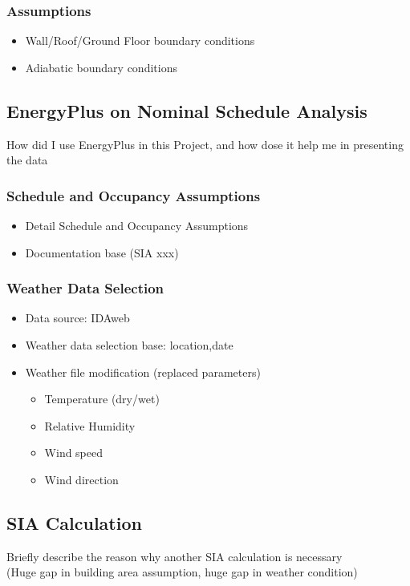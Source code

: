 \documentclass[11pt, a4paper]{article}
\theoremstyle{definition}
\begin{document}
		\subsubsection{Assumptions}
			\begin{itemize}
				\item Wall/Roof/Ground Floor boundary conditions
				\item Adiabatic boundary conditions
			\end{itemize}
			
	\subsection{EnergyPlus on Nominal Schedule Analysis}
		How did I use EnergyPlus in this Project, and how dose it help me in presenting the data
		
		
		\subsubsection{Schedule and Occupancy Assumptions}
			\begin{itemize}
				\item Detail Schedule and Occupancy Assumptions
				\item Documentation base (SIA xxx)
			\end{itemize}
			
		\subsubsection{Weather Data Selection}
			\begin{itemize}
				\item Data source: IDAweb
				\item Weather data selection base: location,date
				\item Weather file modification (replaced parameters)
					\begin{itemize}
						\item Temperature (dry/wet)
						\item Relative Humidity
						\item Wind speed
						\item Wind direction
					\end{itemize}
			\end{itemize}
			

	\subsection{SIA Calculation}
	Briefly describe the reason why another SIA calculation is necessary\\
	(Huge gap in building area assumption, huge gap in weather condition)
\end{document}
